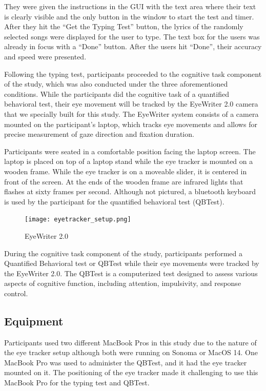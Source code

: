 \documentclass[manuscript, screen, review]{acmart} %
\begin{document}
They were given the instructions in the GUI with the text area where their text is clearly visible and the only button in the window to start the test and timer. 
After they hit the ``Get the Typing Test'' button, the lyrics of the randomly selected songs were displayed for the user to type. 
The text box for the users was already in focus with a ``Done'' button. After the users hit ``Done'', their accuracy and speed were presented.

Following the typing test, participants proceeded to the cognitive task component of the study, which was also conducted under the three aforementioned conditions. 
While the participants did the cognitive task of a quantified behavioral test, their eye movement will be tracked by the EyeWriter 2.0 camera that we specially built for this study. 
The EyeWriter system consists of a camera mounted on the participant's laptop, which tracks eye movements and allows for precise measurement of gaze direction and fixation duration.

Participants were seated in a comfortable position facing the laptop screen.
The laptop is placed on top of a laptop stand while the eye tracker is mounted on a wooden frame. 
While the eye tracker is on a moveable slider, it is centered in front of the screen. 
At the ends of the wooden frame are infrared lights that flashes at sixty frames per second. %
Although not pictured, a bluetooth keyboard is used by the participant for the quantified behavioral test (QBTest).

\begin{figure}
  \texttt{[image: eyetracker\_setup.png]}
  \caption{EyeWriter 2.0}
\end{figure}

During the cognitive task component of the study, participants performed a Quantified Behavioral test or QBTest while their eye movements were tracked by the EyeWriter 2.0.
The QBTest is a computerized test designed to assess various aspects of cognitive function, including attention, impulsivity, and response control.

\subsection[short]{Equipment} 
Participants used two different MacBook Pros in this study due to the nature of the eye tracker setup although both were running on Sonoma or MacOS 14. One MacBook Pro was used to administer the QBTest, and it had the eye tracker mounted on it. The positioning of the eye tracker made it challenging to use this MacBook Pro for the typing test and QBTest. 
\end{document}
